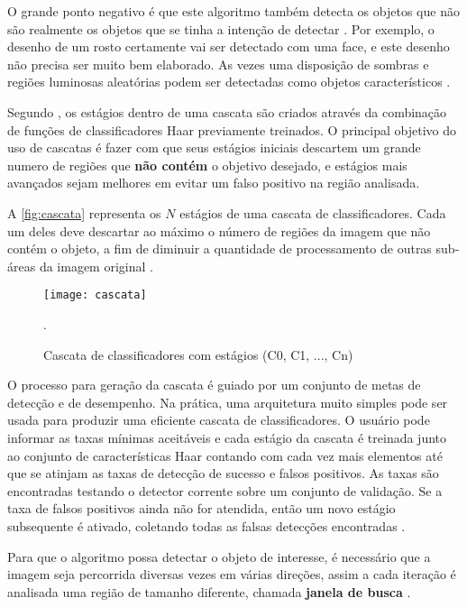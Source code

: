 O grande ponto negativo é que este algoritmo também detecta os objetos que não são realmente os objetos que se tinha a intenção de detectar \cite{drmathew_java_programming}. Por exemplo, o desenho de um rosto certamente vai ser detectado com uma face, e este desenho não precisa ser muito bem elaborado. As vezes uma disposição de sombras e regiões luminosas aleatórias podem ser detectadas como objetos característicos .

Segundo \cite{gustavo_cascata}, os estágios dentro de uma cascata são criados através da combinação de funções de classificadores Haar previamente treinados. O principal objetivo do uso de cascatas é fazer com que seus estágios iniciais descartem um grande numero de regiões que \textbf{não contém} o objetivo desejado, e estágios mais avançados sejam melhores em evitar um falso positivo na região analisada. 

A \autoref{fig:cascata} representa os $N$ estágios de uma cascata de classificadores. Cada um deles deve descartar ao máximo o número de regiões da imagem que não contém o objeto, a fim de diminuir a quantidade de processamento de outras sub-áreas da imagem original \cite{gustavo_cascata}.

 \begin{figure}[h]
	\centering
	\texttt{[image: cascata]}
	\caption{Cascata de classificadores com estágios (C0, C1, ..., Cn)}.
	\label{fig:cascata}
\end{figure}

O processo para geração da cascata é guiado por um conjunto de metas de detecção e de desempenho. Na prática, uma arquitetura muito simples pode ser usada para produzir uma eficiente cascata de classificadores. O usuário pode informar as taxas mínimas aceitáveis e cada estágio da cascata é treinada junto ao conjunto de características Haar contando com cada vez mais elementos até que se atinjam as taxas de detecção de sucesso e falsos positivos. As taxas são encontradas testando o detector corrente sobre um conjunto de validação. Se a taxa de falsos positivos ainda não for atendida, então um novo estágio subsequente é ativado, coletando todas as falsas detecções encontradas \cite{gustavo_cascata}.

Para que o algoritmo possa detectar o objeto de interesse, é necessário que a imagem seja percorrida diversas vezes em várias direções, assim a cada iteração é analisada uma região de tamanho diferente, chamada \textbf{janela de busca} \cite{gustavo_cascata}. 

